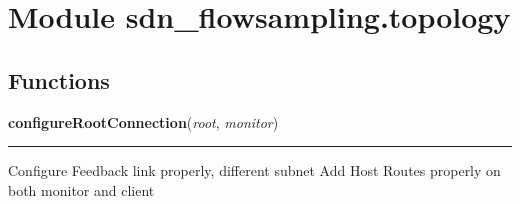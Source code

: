 %
%
%


\section{Module sdn\_flowsampling.topology}

    \label{sdn_flowsampling:topology}


  \subsection{Functions}

    \label{sdn_flowsampling:topology:configureRootConnection}

    \vspace{0.5ex}

\hspace{.8\funcindent}\begin{boxedminipage}{\funcwidth}

    \raggedright \textbf{configureRootConnection}(\textit{root}, \textit{monitor})

    \vspace{-1.5ex}

    \rule{\textwidth}{0.5\fboxrule}
\setlength{\parskip}{2ex}
    Configure Feedback link properly, different subnet Add Host Routes 
    properly on both monitor and client

\setlength{\parskip}{1ex}
    \end{boxedminipage}



